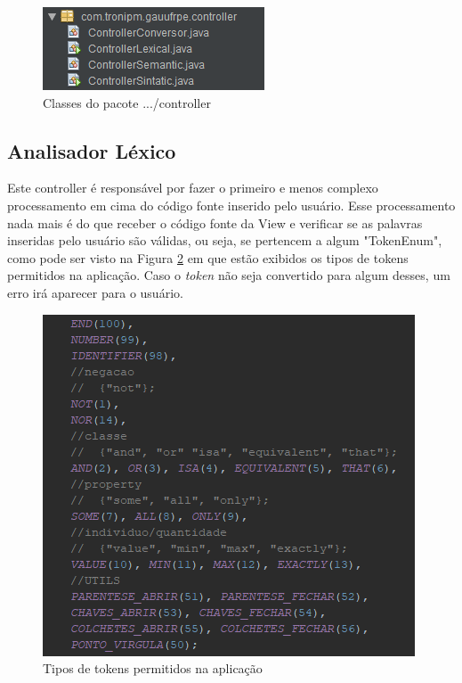 \documentclass{bcc}
\begin{document}
\begin{figure}[H]
\centering
\includegraphics[width=.7\textwidth]{Figuras/pacote_controller.png}
\caption{Classes do pacote .../controller}
\label{fig:pacotesController}
\end{figure}

\fi

\subsection{Analisador Léxico}

Este controller é responsável por fazer o primeiro e menos complexo processamento em cima do código fonte inserido pelo usuário. Esse processamento nada mais é do que receber o código fonte da View e verificar se as palavras inseridas pelo usuário são válidas, ou seja, se pertencem a algum "TokenEnum", como pode ser visto na Figura \ref{fig:codigoTokenenum} em que estão exibidos os tipos de tokens permitidos na aplicação. Caso o \textit{token} não seja convertido para algum desses, um erro irá aparecer para o usuário.

\begin{figure}[H]
\centering
\includegraphics[width=.7\textwidth]{Figuras/codigo_tokenenum.png}
\caption{Tipos de tokens permitidos na aplicação}
\label{fig:codigoTokenenum}
\end{figure}
\end{document}
